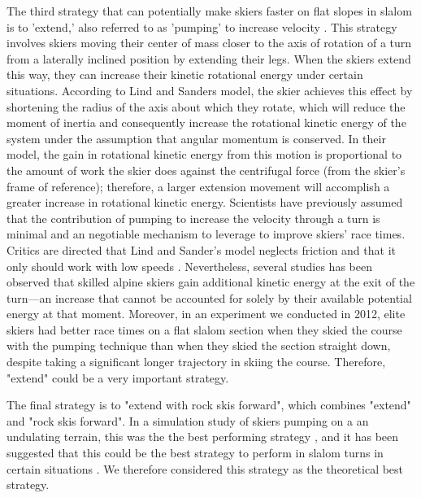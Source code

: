 The third strategy that can potentially make skiers faster on flat slopes in slalom is to 'extend,' also referred to as 'pumping' to increase velocity \cite{lind_physics_2004}. This strategy involves skiers moving their center of mass closer to the axis of rotation of a turn from a laterally inclined position by extending their legs. When the skiers extend this way, they can increase their kinetic rotational energy under certain situations. According to Lind and Sanders \cite{lind_physics_2004} model, the skier achieves this effect by shortening the radius of the axis about which they rotate, which will reduce the moment of inertia and consequently increase the rotational kinetic energy of the system under the assumption that angular momentum is conserved. In their model, the gain in rotational kinetic energy from this motion is proportional to the amount of work the skier does against the centrifugal force (from the skier's frame of reference); therefore, a larger extension movement will accomplish a greater increase in rotational kinetic energy. Scientists have previously assumed that the contribution of pumping to increase the velocity through a turn is minimal and an negotiable mechanism to leverage to improve skiers' race times\cite{supej_differential_2008}. Critics are directed that Lind and Sander's model neglects friction and that it only should work with low speeds \cite{supej_differential_2008, supej_how_2010}. Nevertheless, several studies has been observed that skilled alpine skiers gain additional kinetic energy at the exit of the turn—an increase that cannot be accounted for solely by their available potential energy at that moment\cite{reid_kinematic_2010, supej_how_2010, supej_differential_2008}. Moreover, in an experiment we conducted in 2012, elite skiers had better race times on a flat slalom section when they skied the course with the pumping technique than when they skied the section straight down, despite taking a significant longer trajectory in skiing the course. Therefore, "extend" could be a very important strategy.  

The final strategy is to "extend with rock skis forward", which combines "extend" and "rock skis forward". In a simulation study of skiers pumping on a an undulating terrain, this was the the best performing strategy \cite{mote_accelerations_1983}, and it has been suggested that this could be the best strategy to perform in slalom turns in certain situations \cite{reid_kinematic_2010}. We therefore considered this strategy as the theoretical best strategy. 

